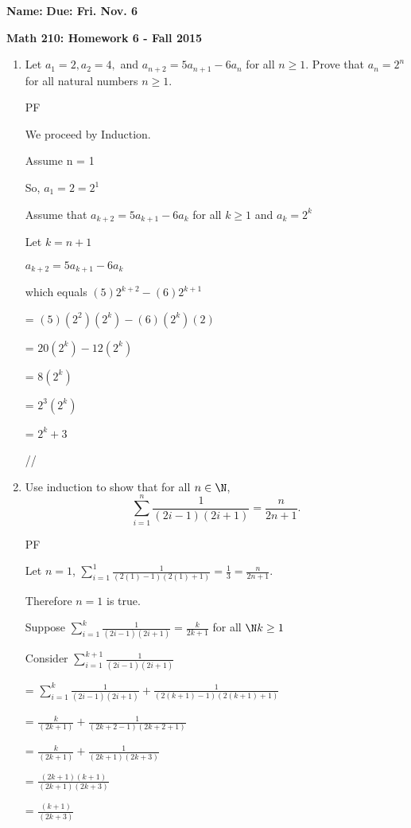 \documentclass[12pt]{article}
\begin{document}
\textbf{Name:}    \hspace{4in} \textbf{Due: Fri. Nov. 6}
\begin{center} \textbf{Math 210: Homework 6 - Fall 2015} \end{center}

\begin{enumerate}

\item Let $a_1 = 2, a_2 = 4,$ and $a_{n+2} = 5a_{n+1} - 6a_n$ for all $n \geq 1$.  Prove that $a_n = 2^n$ for all natural numbers $n \geq 1$.
{PF

We proceed by Induction.

Assume n = 1

So, $a_1 = 2 = 2^1$

Assume that $a_{k+2} = 5a_{k+1}- 6a_k$ for all $k \geq 1$ and  $a_k = 2^k$

Let $k = n + 1$

$a_{k+2} = 5a_{k+1}- 6a_k$

which equals  $(5)2^{k+2}  - (6)2^{k+1}$

= $(5)(2^2)(2^k) - (6)(2^k)(2)$

= $20(2^k) - 12(2^k)$

= $8(2^k)$

= $2^3(2^k)$

= $2^k+3$

//
}





\item Use induction to show that for all $n \in \N$,
$$ \sum_{i=1}^{n} \frac{1}{(2i - 1)(2i + 1)} = \frac{n}{2n + 1}.$$
{PF

Let $n = 1$, $ \sum_{i=1}^{1} \frac{1}{(2(1) - 1)(2(1) + 1)} = \frac{1}{3}  = \frac{n}{2n + 1}.$

Therefore $n = 1$ is true.

Suppose $ \sum_{i=1}^{k} \frac{1}{(2i - 1)(2i + 1)} = \frac{k}{2k + 1}$ for all $\N k \geq 1$

Consider  $ \sum_{i=1}^{k+1} \frac{1}{(2i - 1)(2i + 1)}$

=   $ \sum_{i=1}^{k} \frac{1}{(2i - 1)(2i + 1)}+  \frac{1}{(2(k+1) - 1)(2(k+1) + 1)}$

= $\frac{k}{(2k + 1)}+  \frac{1}{(2k+2-1) (2k+2+ 1)}$

= $\frac{k}{(2k + 1)}+  \frac{1}{(2k+1)(2k+3)}$

= $\frac{(2k+1)(k+1)}{(2k + 1)(2k+3)}$

= $\frac{(k+1)}{(2k+3)}$

}
\end{enumerate}
\end{document}
